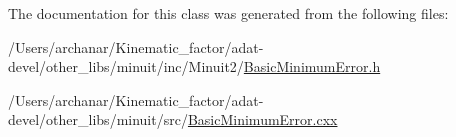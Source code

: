 The documentation for this class was generated from the following files\+:\begin{DoxyCompactItemize}
\item 
/\+Users/archanar/\+Kinematic\+\_\+factor/adat-\/devel/other\+\_\+libs/minuit/inc/\+Minuit2/\mbox{\hyperlink{adat-devel_2other__libs_2minuit_2inc_2Minuit2_2BasicMinimumError_8h}{Basic\+Minimum\+Error.\+h}}\item 
/\+Users/archanar/\+Kinematic\+\_\+factor/adat-\/devel/other\+\_\+libs/minuit/src/\mbox{\hyperlink{adat-devel_2other__libs_2minuit_2src_2BasicMinimumError_8cxx}{Basic\+Minimum\+Error.\+cxx}}\end{DoxyCompactItemize}
